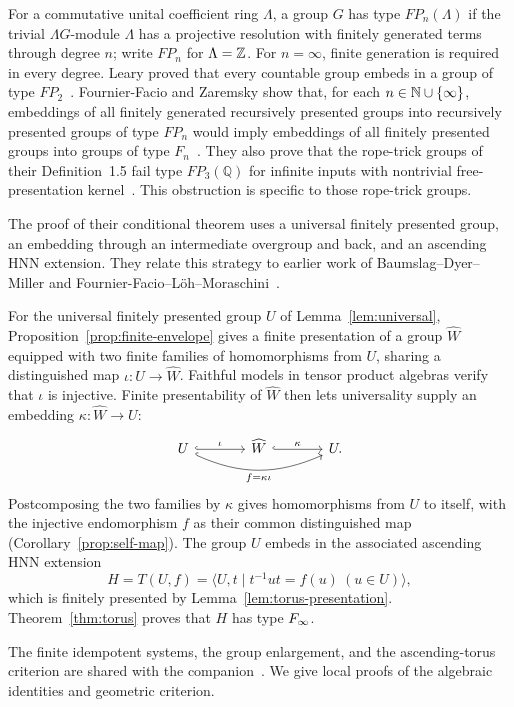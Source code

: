 For a commutative unital coefficient ring $\Lambda$, a group $G$ has
type $FP_n(\Lambda)$ if the trivial $\Lambda G$-module $\Lambda$ has a
projective resolution with finitely generated terms through degree $n$;
write $FP_n$ for $\Lambda=\mathbb Z$. For $n=\infty$, finite generation is
required in every degree. Leary proved that every countable group embeds
in a group of type $FP_2$~\cite{Leary2018}. Fournier-Facio and Zaremsky
show that, for each $n\in\mathbb N\cup\{\infty\}$, embeddings of all finitely
generated recursively presented groups into recursively presented
groups of type $FP_n$ would imply embeddings of all finitely presented
groups into groups of type $F_n$~\cite[Theorem~A]{FFZ2026}.
They also prove that the rope-trick groups of their Definition~1.5 fail
type $FP_3(\mathbb Q)$ for infinite inputs with nontrivial
free-presentation kernel~\cite[Definition~1.5 and Theorem~B]{FFZ2026}.
This obstruction is specific to those rope-trick groups.

The proof of their conditional theorem uses a universal finitely
presented group, an embedding through an intermediate overgroup and
back, and an ascending HNN extension. They relate this strategy to
earlier work of Baumslag--Dyer--Miller and
Fournier-Facio--L\"oh--Moraschini~\cite[Section~2]{FFZ2026}.

For the universal finitely presented group $U$ of
Lemma~\ref{lem:universal}, Proposition~\ref{prop:finite-envelope}
gives a finite presentation of a group $\widehat W$ equipped with two
finite families of homomorphisms from $U$, sharing a distinguished map
$\iota:U\to\widehat W$. Faithful models in tensor product algebras
verify that $\iota$ is injective. Finite presentability of $\widehat W$ then lets
universality supply an embedding $\kappa:\widehat W\to U$:
\[
\begin{tikzcd}[column sep=large]
 U \arrow[r,hook,"\iota"]
   \arrow[rr,bend right=24,hook,"f=\kappa\iota"']
 & \widehat W \arrow[r,hook,"\kappa"] & U.
\end{tikzcd}
\]
Postcomposing the two families by $\kappa$ gives homomorphisms from $U$
to itself, with the injective endomorphism $f$ as their common
distinguished map (Corollary~\ref{prop:self-map}). The group $U$ embeds
in the associated ascending HNN extension
\[
 H=T(U,f)=\langle U,t\mid t^{-1}ut=f(u)\ (u\in U)\rangle,
\]
which is finitely presented by Lemma~\ref{lem:torus-presentation}.
Theorem~\ref{thm:torus} proves that $H$ has type $F_\infty$.

The finite idempotent systems, the group enlargement, and the
ascending-torus criterion are shared with the
companion~\cite[Sections~2.1, 2.3--2.5, and~3.1]{OpenAIOvergroups}.
We give local proofs of the algebraic identities and geometric
criterion.

